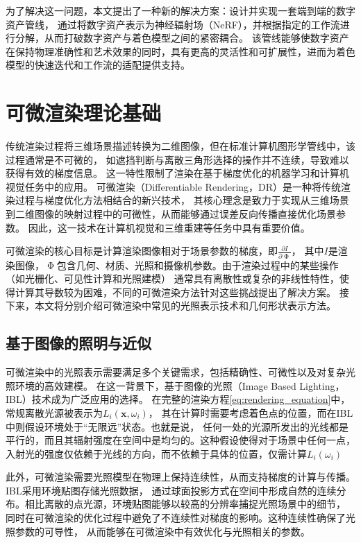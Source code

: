 为了解决这一问题，本文提出了一种新的解决方案：设计并实现一套端到端的数字资产管线，
通过将数字资产表示为神经辐射场（NeRF），并根据指定的工作流进行分解，从而打破数字资产与着色模型之间的紧密耦合。
该管线能够使数字资产在保持物理准确性和艺术效果的同时，具有更高的灵活性和可扩展性，进而为着色模型的快速迭代和工作流的适配提供支持。

\section{可微渲染理论基础}
传统渲染过程将三维场景描述转换为二维图像，但在标准计算机图形学管线中，该过程通常是不可微的，
如遮挡判断与离散三角形选择的操作并不连续，导致难以获得有效的梯度信息。
这一特性限制了渲染在基于梯度优化的机器学习和计算机视觉任务中的应用。
可微渲染（Differentiable Rendering，DR）是一种将传统渲染过程与梯度优化方法相结合的新兴技术，
其核心理念是致力于实现从三维场景到二维图像的映射过程中的可微性，从而能够通过误差反向传播直接优化场景参数。
因此，这一技术在计算机视觉和三维重建等任务中具有重要价值。

可微渲染的核心目标是计算渲染图像相对于场景参数的梯度，即$\tfrac{\partial I}{\partial \upPhi}$，
其中$I$是渲染图像，$\upPhi$包含几何、材质、光照和摄像机参数。由于渲染过程中的某些操作（如光栅化、可见性计算和光照建模）
通常具有离散性或复杂的非线性特性，使得计算其导数较为困难，不同的可微渲染方法针对这些挑战提出了解决方案。
接下来，本文将分别介绍可微渲染中常见的光照表示技术和几何形状表示方法。

\subsection{基于图像的照明与近似}
可微渲染中的光照表示需要满足多个关键需求，包括精确性、可微性以及对复杂光照环境的高效建模。
在这一背景下，基于图像的光照（Image Based Lighting，IBL）技术成为广泛应用的选择。
在完整的渲染方程\eqref{eq:rendering_equation}中，常规离散光源被表示为$L_i(\mathbf{x},\omega_i)$，
其在计算时需要考虑着色点的位置，而在IBL中则假设环境处于“无限远”状态。也就是说，
任何一处的光源所发出的光线都是平行的，而且其辐射强度在空间中是均匀的。这种假设使得对于场景中任何一点，
入射光的强度仅依赖于光线的方向，而不依赖于具体的位置，仅需计算$L_i(\omega_i)$

此外，可微渲染需要光照模型在物理上保持连续性，从而支持梯度的计算与传播。IBL采用环境贴图存储光照数据，
通过球面投影方式在空间中形成自然的连续分布。相比离散的点光源，环境贴图能够以较高的分辨率捕捉光照场景中的细节，
同时在可微渲染的优化过程中避免了不连续性对梯度的影响。这种连续性确保了光照参数的可导性，
从而能够在可微渲染中有效优化与光照相关的参数。

